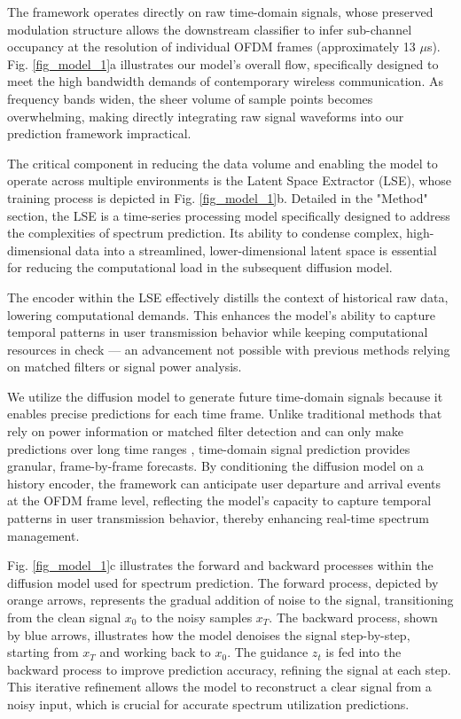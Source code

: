 \documentclass[lettersize,journal]{IEEEtran}
\begin{document}
The framework operates directly on raw time-domain signals, whose preserved modulation structure allows the downstream classifier to infer sub-channel occupancy at the resolution of individual OFDM frames (approximately 13 $\mu$s). Fig. \ref{fig_model_1}a illustrates our model's overall flow, specifically designed to meet the high bandwidth demands of contemporary wireless communication. As frequency bands widen, the sheer volume of sample points becomes overwhelming, making directly integrating raw signal waveforms into our prediction framework impractical.

The critical component in reducing the data volume and enabling the model to operate across multiple environments is the Latent Space Extractor (LSE), whose training process is depicted in Fig. \ref{fig_model_1}b. Detailed in the "Method" section, the LSE is a time-series processing model specifically designed to address the complexities of spectrum prediction. Its ability to condense complex, high-dimensional data into a streamlined, lower-dimensional latent space \cite{model_ref1} is essential for reducing the computational load in the subsequent diffusion model.

The encoder within the LSE effectively distills the context of historical raw data, lowering computational demands. This enhances the model's ability to capture temporal patterns in user transmission behavior while keeping computational resources in check — an advancement not possible with previous methods relying on matched filters or signal power analysis.

We utilize the diffusion model to generate future time-domain signals because it enables precise predictions for each time frame. Unlike traditional methods that rely on power information or matched filter detection and can only make predictions over long time ranges \cite{intro_ref7, intro_ref8, intro_ref9}, time-domain signal prediction provides granular, frame-by-frame forecasts. By conditioning the diffusion model on a history encoder, the framework can anticipate user departure and arrival events at the OFDM frame level, reflecting the model's capacity to capture temporal patterns in user transmission behavior, thereby enhancing real-time spectrum management.

Fig. \ref{fig_model_1}c illustrates the forward and backward processes within the diffusion model used for spectrum prediction. The forward process, depicted by orange arrows, represents the gradual addition of noise to the signal, transitioning from the clean signal $x_0$ to the noisy samples $x_T$. The backward process, shown by blue arrows, illustrates how the model denoises the signal step-by-step, starting from $x_T$ and working back to $x_0$. The guidance $z_t$ is fed into the backward process to improve prediction accuracy, refining the signal at each step. This iterative refinement allows the model to reconstruct a clear signal from a noisy input, which is crucial for accurate spectrum utilization predictions. 
\end{document}
